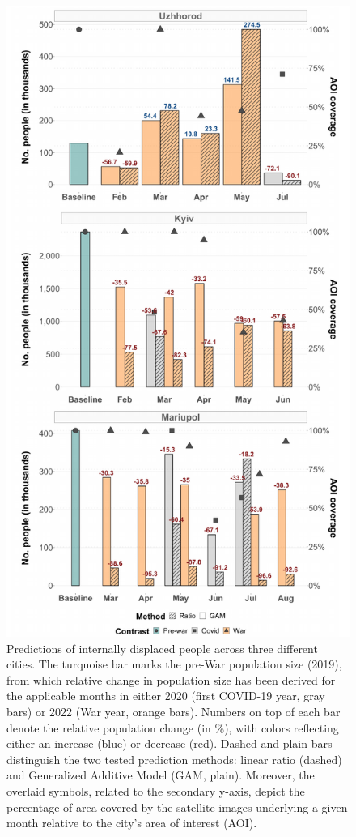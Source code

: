 \documentclass[sn-basic]{sn-jnl}%
\begin{document}
{%
\begin{figure}[hbtp]
\begin{center}
\includegraphics[scale = 0.5]{Figures/Main_IDP_pred_Figure.pdf}
\end{center}
\caption{Predictions of internally displaced people across three different cities. The turquoise bar marks the pre-War population size (2019), from which relative change in population size has been derived for the applicable months in either 2020 (first COVID-19 year, gray bars) or 2022 (War year, orange bars). Numbers on top of each bar denote the relative population change (in \%), with colors reflecting either an increase (blue) or decrease (red). Dashed and plain bars distinguish the two tested prediction methods: linear ratio (dashed) and Generalized Additive Model (GAM, plain). Moreover, the overlaid symbols, related to the secondary y-axis, depict the percentage of area covered by the satellite images underlying a given month relative to the city's area of interest (AOI).
}
\end{figure}}
\end{document}
